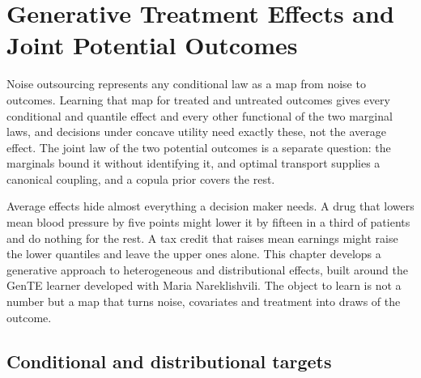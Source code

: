 \chapter{Generative Treatment Effects and Joint Potential Outcomes}\label{ch:gente}

\begin{tcolorbox}[colback=gray!6,colframe=gray!50,title=In brief,fonttitle=\normalfont\itshape,coltitle=black,colbacktitle=gray!15,boxrule=0.4pt,arc=1pt]
Noise outsourcing represents any conditional law as a map from noise to outcomes. Learning that map for treated and untreated outcomes gives every conditional and quantile effect and every other functional of the two marginal laws, and decisions under concave utility need exactly these, not the average effect. The joint law of the two potential outcomes is a separate question: the marginals bound it without identifying it, and optimal transport supplies a canonical coupling, and a copula prior covers the rest.
\end{tcolorbox}

Average effects hide almost everything a decision maker needs. A drug that lowers mean blood pressure by five points might lower it by fifteen in a third of patients and do nothing for the rest. A tax credit that raises mean earnings might raise the lower quantiles and leave the upper ones alone. This chapter develops a generative approach to heterogeneous and distributional effects, built around the GenTE learner developed with Maria Nareklishvili. The object to learn is not a number but a map that turns noise, covariates and treatment into draws of the outcome.

\section{Conditional and distributional targets}

